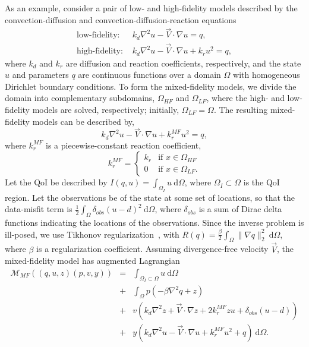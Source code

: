 \documentclass[review,sort&compress]{elsarticle}
\theoremstyle{plain} %
\theoremstyle{definition} %
\begin{document}
As an example, consider a pair of low- and high-fidelity models described by the convection-diffusion and convection-diffusion-reaction equations
\begin{subequations}
\begin{align}
\textrm{low-fidelity:   } & k_d\nabla^2 u - \vec{V}\cdot\nabla u = q, \label{eq:cdvcdrLF}\\
\textrm{high-fidelity:   } & k_d\nabla^2 u - \vec{V}\cdot\nabla u + k_ru^2 = q, \label{eq:cdvcdrHF}
\end{align}
\end{subequations}
where $k_d$ and $k_r$ are diffusion and reaction coefficients, respectively, and the state $u$ and parameters $q$ are continuous functions over a domain $\Omega$ with homogeneous Dirichlet boundary conditions. To form the mixed-fidelity models, we divide the domain into complementary subdomains, $\Omega_{HF}$ and $\Omega_{LF}$, where the high- and low-fidelity models are solved, respectively; initially, $\Omega_{LF}=\Omega$. The resulting mixed-fidelity models can be described by,
%
\begin{equation}
k_d\nabla^2 u - \vec{V}\cdot\nabla u + k^{MF}_ru^2= q,
\end{equation}
%
where $k^{MF}_r$ is a piecewise-constant reaction coefficient,
%
\begin{equation}
k^{MF}_r=
\begin{cases}
k_r & \textrm{if }x\in\Omega_{HF} \\
0 & \textrm{if }x\in\Omega_{LF}.
\end{cases}
\end{equation}
%
Let the QoI be described by $I(q,u)=\int_{\Omega_I} u \:\textrm{d}\Omega$, where $\Omega_I\subset\Omega$ is the QoI region. Let the observations be of the state at some set of locations, so that the data-misfit term is $\frac{1}{2}\int_\Omega \delta_{obs}(u-d)^2\:\textrm{d}\Omega$, where $\delta_{obs}$ is a sum of Dirac delta functions indicating the locations of the observations. Since the inverse problem is ill-posed, we use Tikhonov regularization~\cite{EngHanNeu00}, with $R(q)=\frac{\beta}{2}\int_\Omega \|\nabla q\|_2^2\:\textrm{d}\Omega$, where $\beta$ is a regularization coefficient. Assuming divergence-free velocity $\vec{V}$, the mixed-fidelity model has augmented Lagrangian
\begin{eqnarray}
\mathcal{M}_{MF}((q,u,z)(p,v,y)) &=& \int_{\Omega_I\subset\Omega} u \:\textrm{d}\Omega \nonumber\\
&+& \int_\Omega p(-\beta\nabla^2q+z) \nonumber\\
&+& v(k_d\nabla^2z+\vec{V}\cdot\nabla z+2k^{MF}_rzu+\delta_{obs}(u-d)) \nonumber\\ 
&+& y(k_d\nabla^2u-\vec{V}\cdot\nabla u+k^{MF}_ru^2+q)\:\textrm{d}\Omega.
\end{eqnarray}
\end{document}
